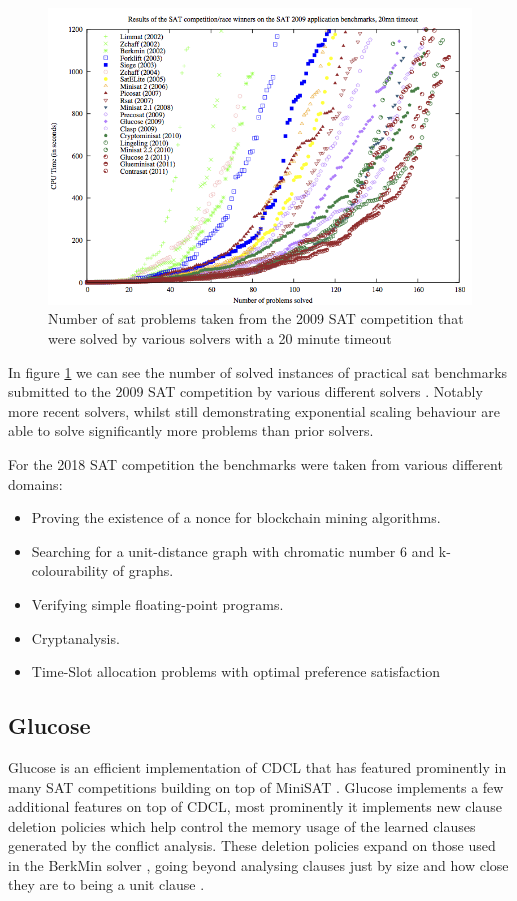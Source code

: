 \begin{figure}
    \centering
    \includegraphics[scale=1]{sat_performance2012.png}
    \caption{Number of sat problems taken from the
    2009 SAT competition that were solved by various solvers
    with a 20 minute timeout \cite{sat2009theory}}
    \label{fig:sat_perf}
\end{figure}

In figure \ref{fig:sat_perf} we can see the number of solved instances of practical
sat benchmarks submitted to the 2009 SAT competition by various different solvers
\cite{sat2009theory}. Notably
more recent solvers, whilst still demonstrating exponential scaling behaviour are
able to solve significantly more problems than prior solvers.

For the 2018 SAT competition the benchmarks were taken from various different domains:
\cite{sat2018descriptions}

\begin{itemize}
    \item Proving the existence of a nonce for blockchain mining algorithms.
    \item Searching for a unit-distance graph with chromatic number 6 and k-colourability of graphs.
    \item Verifying simple floating-point programs.
    \item Cryptanalysis.
    \item Time-Slot allocation problems with optimal preference satisfaction
\end{itemize}

\subsection{Glucose}
Glucose is an efficient implementation of CDCL that has featured prominently
in many SAT competitions \cite{audemard2009glucose} building on top of MiniSAT \cite{een2003extensible}.
Glucose implements a few additional
features on top of CDCL, most prominently it implements new clause deletion policies
which help control the memory usage of the learned clauses generated by
the conflict analysis. These deletion policies expand on those used in the BerkMin solver \cite{goldberg2007berkmin},
going beyond analysing clauses just by size and how close they are to being a unit clause \cite{dechter1990enhancement, bayardo1997using}.

